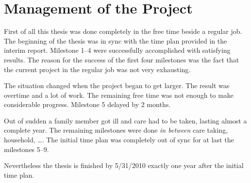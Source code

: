 

\chapter{Management of the Project} %
\label{cha:managment_of_the_project}
First of all this thesis was done completely in the free time beside a regular 
job.  The beginning of the thesis was in sync with the time plan provided in the 
interim report. Milestone 1--4 were successfully accomplished with satisfying
results. The reason for the success of the first four milestones was the fact 
that the current project in the regular job was not very exhausting. 

The situation changed when the project began to get larger. The result was
overtime and a lot of work. The remaining free time was not enough to make
considerable progress. Milestone 5 delayed by 2 months. 

Out of sudden a family member got ill and care had to be taken, lasting almost
a complete year. The remaining milestones were done \emph{in between} care taking,
household, \ldots. The initial time plan was completely out of sync for at last
the milestones 5--9. 

Nevertheless the thesis is finished by 5/31/2010 exactly one year after the
initial time plan. 

